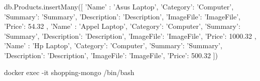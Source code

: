 db.Products.insertMany([
  {
     'Name' : 'Asus Laptop',
     'Category': 'Computer',
     'Summary': 'Summary',
     'Description': 'Description',
     'ImageFile': 'ImageFile',
     'Price': 54.32  
  },
  {
     'Name' : 'Appel Laptop',
     'Category': 'Computer',
     'Summary': 'Summary',
     'Description': 'Description',
     'ImageFile': 'ImageFile',
     'Price': 1000.32  
  },
  {
     'Name' : 'Hp Laptop',
     'Category': 'Computer',
     'Summary': 'Summary',
     'Description': 'Description',
     'ImageFile': 'ImageFile',
     'Price': 500.32  
  }
])

docker exec -it shopping-mongo /bin/bash